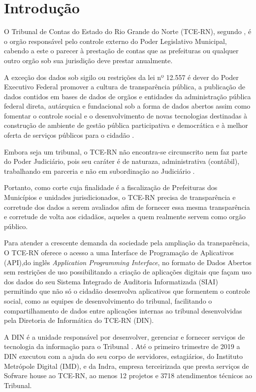\chapter[Introdução]{Introdução}
\label{ch:introducao}

  O Tribunal de Contas do Estado do Rio Grande do Norte (TCE-RN), segundo \cite{Legislativa}, é o orgão responsável pelo controle externo do Poder Legislativo Municipal, cabendo a este o parecer à prestação de contas que as prefeituras ou qualquer outro orgão sob sua jurisdição deve prestar anualmente.

  A exceção dos dados sob sigilo ou restrições da lei nº 12.557 \cite{lei_12527} é dever do Poder Executivo Federal promover a cultura de transparência pública, a publicação de dados contidos em bases de dados de orgãos e entidades da administração pública federal direta, autárquica e fundacional sob a forma de dados abertos assim como fomentar o controle social e o desenvolvimento de novas tecnologias destinadas à construção de ambiente de gestão pública participativa e democrática e à melhor oferta de serviços públicos para o cidadão \cite{dec_8777}.

  Embora seja um tribunal, o TCE-RN não encontra-se circunscrito nem faz parte do Poder Judiciário, pois seu caráter é de naturaza, administrativa (contábil), trabalhando em parceria e não em subordinação ao Judiciário \cite{barreto_tribunais}.

  Portanto, como corte cuja finalidade é a fiscalização de Prefeituras dos Municípios e unidades jurisdicionados, o TCE-RN precisa de transparência e corretude dos dados a serem avaliados afim de fornecer essa mesma transparência e corretude de volta aos cidadãos, aqueles a quem realmente servem como orgão público.

  Para atender a crescente demanda da sociedade pela ampliação da transparência, O TCE-RN oferece o acesso a uma Interface de Programação de Aplicativos (API),do inglês \textit{Application Programming Interface}, no formato de Dados Abertos sem restrições de uso possibilitando a criação de aplicações digitais \cite{dados_abertos_tcern} que façam uso dos dados do seu Sistema Integrado de Auditoria Informatizada (SIAI) permitindo que não só o cidadão desenvolva aplicativos que formentem o controle social, como as equipes de desenvolvimento do tribunal, facilitando o compartilhamento de dados entre aplicações internas ao tribunal desenvolvidas pela Diretoria de Informática do TCE-RN (DIN).

  A DIN é a unidade responsável por desenvolver, gerenciar e fornecer serviços de tecnologia da informação para o Tribunal \cite{relatorio_trimestral}. Até o primeiro trimestre de 2019 a DIN executou com a ajuda do seu corpo de servidores, estagiários, do Instituto Metrópole Digital (IMD), e da Indra, empresa terceirizada que presta serviços de Sofware house ao TCE-RN, ao menos 12 projetos e 3718 atendimentos técnicos ao Tribunal.

